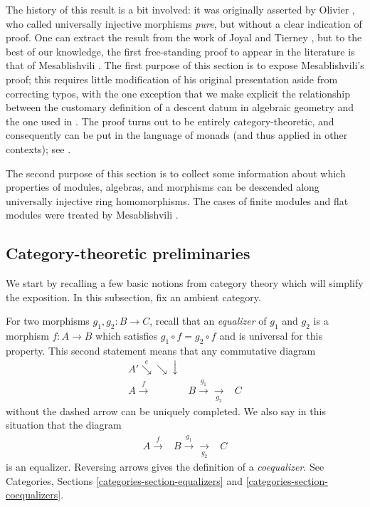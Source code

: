 \medskip\noindent
The history of this result is a bit involved: it was originally asserted
by Olivier \cite{olivier}, who  called universally injective morphisms
{\it pure}, but without a clear indication of proof. One can extract the
result from the work of Joyal and Tierney \cite{joyal-tierney}, but to the
best of our knowledge, the first free-standing proof to appear in the
literature is that of Mesablishvili \cite{mesablishvili1}. The first purpose
of this section is to expose Mesablishvili's proof; this requires little
modification of his original presentation aside from correcting typos, with
the one exception that we make explicit the relationship between the
customary definition of a descent datum in algebraic geometry and the one
used in \cite{mesablishvili1}. The proof turns out to be entirely
category-theoretic, and consequently can be put in the language of monads
(and thus applied in other contexts); see \cite{janelidze-tholen}.

\medskip\noindent
The second purpose of this section is to collect some information about which
properties of modules, algebras, and morphisms can be descended along
universally injective ring homomorphisms. The cases of finite modules
and flat modules were treated by Mesablishvili \cite{mesablishvili2}.


\subsection{Category-theoretic preliminaries}
\label{descent-subsection-category-prelims}

We start by recalling a few basic notions from category theory which will
simplify the exposition. In this subsection, fix an ambient category.

\medskip\noindent
For two morphisms $g_1, g_2: B \to C$, recall that an {\it equalizer}
of $g_1$ and $g_2$  is a morphism $f: A \to B$ which satisfies
$g_1 \circ f = g_2 \circ f$ and is universal for this property.
This second statement means that any commutative diagram
$$
\begin{array}{ccc}A' \overset{e}{\searrow}\searrow\downarrow &  &  \\ A \overset{f}{\longrightarrow} & B \overset{g_1}{\longrightarrow}\underset{g_2}{\longrightarrow} & C\end{array}
$$
without the dashed arrow can be uniquely completed. We also say in this
situation that the diagram
\begin{equation}
\label{equation-equalizer}
\begin{array}{ccc}A \overset{f}{\longrightarrow} & B \overset{g_1}{\longrightarrow}\underset{g_2}{\longrightarrow} & C\end{array}
\end{equation}
is an equalizer. Reversing arrows gives the definition of a {\it coequalizer}.
See Categories, Sections \ref{categories-section-equalizers} and
\ref{categories-section-coequalizers}.

